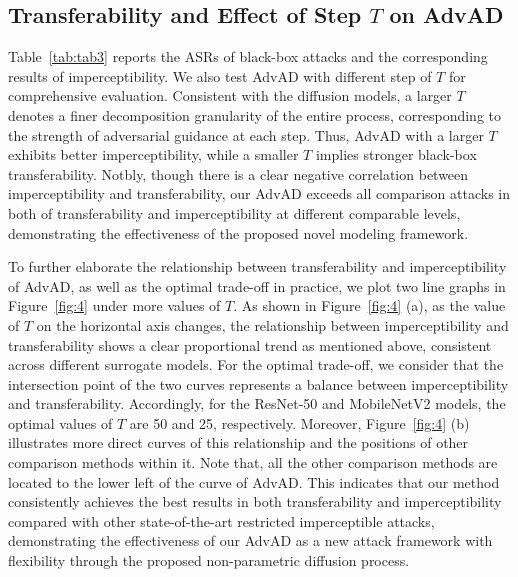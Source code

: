 \documentclass{article}
\begin{document}
\subsection{Transferability and Effect of Step $T$ on AdvAD}
Table~\ref{tab:tab3} reports the ASRs of black-box attacks and the corresponding results of imperceptibility. We also test AdvAD with different step of $T$ for comprehensive evaluation. Consistent with the diffusion models, a larger $T$ denotes a finer decomposition granularity of the entire process, corresponding to the strength of adversarial guidance at each step. Thus, AdvAD with a larger $T$ exhibits better imperceptibility, while a smaller $T$ implies stronger black-box transferability. Notbly, though there is a clear negative correlation between imperceptibility and transferability, our AdvAD exceeds all comparison attacks in both of transferability and imperceptibility at different comparable levels, demonstrating the effectiveness of the proposed novel modeling framework. 

To further elaborate the relationship between transferability and imperceptibility of AdvAD, as well as the optimal trade-off in practice, we plot two line graphs in Figure~\ref{fig:4} under more values of $T$. As shown in Figure~\ref{fig:4} (a), as the value of $T$ on the horizontal axis changes, the relationship between imperceptibility and transferability shows a clear proportional trend as mentioned above, consistent across different surrogate models. For the optimal trade-off, we consider that the intersection point of the two curves represents a balance between imperceptibility and transferability. Accordingly, for the ResNet-50 and MobileNetV2 models, the optimal values of $T$ are 50 and 25, respectively. Moreover, Figure~\ref{fig:4} (b) illustrates more direct curves of this relationship and the positions of other comparison methods within it. Note that, all the other comparison methods are located to the lower left of the curve of AdvAD. This indicates that our method consistently achieves the best results in both transferability and imperceptibility compared with other state-of-the-art restricted imperceptible attacks, demonstrating the effectiveness of our AdvAD as a new attack framework with flexibility through the proposed non-parametric diffusion process.
\end{document}
